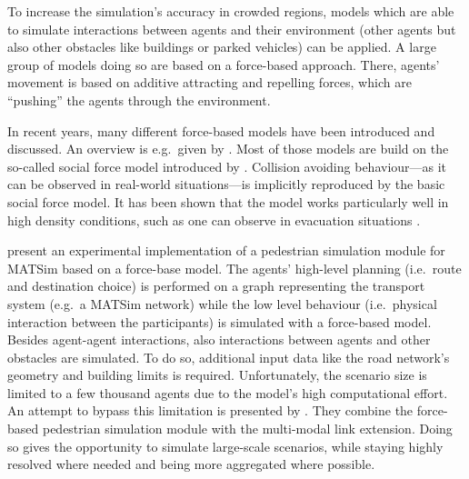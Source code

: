 To increase the simulation's accuracy in crowded regions, models which are able to simulate interactions between agents and their environment (other agents but also other obstacles like buildings or parked vehicles) can be applied. A large group of models doing so are based on a force-based approach. There, agents' movement is based on additive attracting and repelling forces, which are ``pushing'' the agents through the environment.

In recent years, many different force-based models have been introduced and discussed. An overview is e.g.~given by \citet{OlesonEtAl_BazzanKluegl_2009}. Most of those models are build on the so-called social force model introduced by \citet{HelbingMolnar_PhysRevE_1995}. Collision avoiding behaviour---as it can be observed in real-world situations---is implicitly reproduced by the basic social force model. It has been shown that the model works particularly well in high density conditions, such as one can observe in evacuation situations \citep{HelbingEtAl_Nature_2000}.

\citet{LaemmelPlaue_PED_2012} present an experimental implementation of a pedestrian simulation module for MATSim based on a force-base model. The agents' high-level planning (i.e.\ route and destination choice) is performed on a graph representing the transport system (e.g.~a MATSim network) while the low level behaviour (i.e.\ physical interaction between the participants) is simulated with a force-based model. Besides agent-agent interactions, also interactions between agents and other obstacles are simulated. To do so, additional input data like the road network's geometry and building limits is required. Unfortunately, the scenario size is limited to a few thousand agents due to the model's high computational effort. An attempt to bypass this limitation is presented by \citet{DoblerLaemmel_PED_2012}. They combine the force-based pedestrian simulation module with the multi-modal link extension. Doing so gives the opportunity to simulate large-scale scenarios, while staying highly resolved where needed and being more aggregated where possible.

